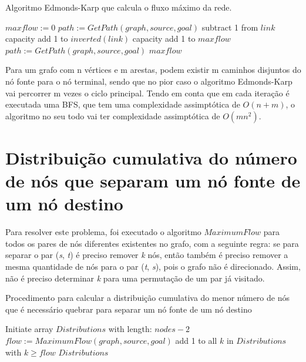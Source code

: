 \documentclass[12pt,a4paper]{article}
\begin{document}
\begin{algorithm}
\caption{Algoritmo Edmonds-Karp que calcula o fluxo máximo da rede.}\label{alg:residual_network}
\begin{algorithmic}[1]
    \State $maxflow := 0 $
    \State $path := GetPath(graph,source,goal)$
      		\State subtract 1 from $link$ capacity
        	\State add 1 to $inverted(link)$ capacity
      \EndFor
      \State add 1 to $maxflow$
      \State $path := GetPath(graph,source,goal)$
  	\EndWhile
  	\Return $maxflow$
\EndProcedure
\end{algorithmic}
\end{algorithm}

Para um grafo com n vértices e m arestas, podem existir m caminhos disjuntos do nó fonte para o nó terminal, sendo que no pior caso o algoritmo Edmonds-Karp vai percorrer m vezes o ciclo principal.
Tendo em conta que em cada iteração é executada uma BFS, que tem uma complexidade assimptótica de $O(n+m)$, o algoritmo no seu todo vai ter complexidade assimptótica de $O(m n^2)$.

\section{Distribuição cumulativa do número de nós que separam um nó fonte de um nó destino}

Para resolver este problema, foi executado o algoritmo $MaximumFlow$ para todos os pares de nós diferentes existentes no grafo, com a seguinte regra: se para separar o par (\textit{s}, \textit{t}) é preciso remover \textit{k} nós, então também é preciso remover a mesma quantidade de nós para o par (\textit{t}, \textit{s}), pois o grafo não é direcionado. Assim, não é preciso determinar \textit{k} para uma permutação de um par já visitado.

\begin{algorithm}
\caption{Procedimento para calcular a distribuição cumulativa do menor número de nós que é necessário quebrar para separar um nó fonte de um nó destino}\label{alg:distribution}
\begin{algorithmic}[1]
	\State Initiate array $Distributions$ with length: $nodes - 2$
          	  \State $flow := MaximumFlow(graph,source,goal)$
              	\State add 1 to all $k$ in $Distributions$ with $k \geq flow$
              \EndIf
      \EndFor
    \EndFor
  	\Return $Distributions$
\EndProcedure
\end{algorithmic}
\end{algorithm}
\end{document}
